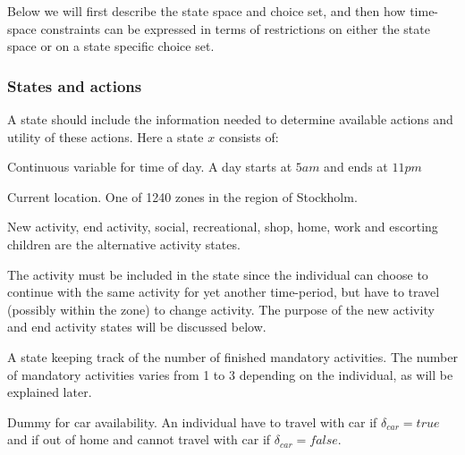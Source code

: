 Below we will first describe the state space and choice set, and then how time-space constraints can be expressed in terms of restrictions on either the state space or on a state specific choice set.

\subsubsection{States and actions}
A state should include the information needed to determine available actions and utility of these actions. Here a state $x$ consists of:
\begin{description}[style=multiline,leftmargin=4cm,font=\normalfont]
\item[{Time $t \in [5\unit{am},11\unit{pm}] $}:] Continuous variable for time of day. A day starts at $5\unit{am}$ and ends at $11\unit{pm}$
\item[{Location $L \in [1,1240]$:}] Current location. One of 1240 zones in the region of Stockholm. 
\item[Activity $A$:] New activity, end activity, social, recreational, shop, home, work and escorting children are the alternative activity states. 

The activity must be included in the state since the individual can choose to continue with the same activity for yet another time-period, but have to travel (possibly within the zone) to change activity. The purpose of the new activity and end activity states will be discussed below.
\item[{Errand indicator $E \in [0,3]$:}] A state keeping track of the number of finished mandatory activities. The number of mandatory activities varies from 1 to 3 depending on the individual, as will be explained later. 
\item[Car dummy $\delta_{car} \in \{true,false\}$:] Dummy for car availability. An individual have to travel with car if $\delta_{car} = true$ and if out of home and cannot travel with car if $\delta_{car} = false$.
\end{description}


